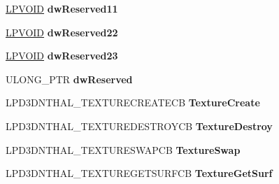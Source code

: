 \begin{DoxyCompactItemize}
\item 
\mbox{\label{struct___d3_d_n_t_h_a_l___c_a_l_l_b_a_c_k_s_a8bdbd855926ec876c686cafb674fb800}} 
\hyperlink{interfacevoid}{L\+P\+V\+O\+ID} {\bfseries dw\+Reserved11}
\item 
\mbox{\label{struct___d3_d_n_t_h_a_l___c_a_l_l_b_a_c_k_s_aa2dd9caa928e2311efc2f8edea6fb0ca}} 
\hyperlink{interfacevoid}{L\+P\+V\+O\+ID} {\bfseries dw\+Reserved22}
\item 
\mbox{\label{struct___d3_d_n_t_h_a_l___c_a_l_l_b_a_c_k_s_a8f785ee26b36d60c62904efad6a8d55d}} 
\hyperlink{interfacevoid}{L\+P\+V\+O\+ID} {\bfseries dw\+Reserved23}
\item 
\mbox{\label{struct___d3_d_n_t_h_a_l___c_a_l_l_b_a_c_k_s_a439bb2d9bf1078f262b0f1f8d0606d8a}} 
U\+L\+O\+N\+G\+\_\+\+P\+TR {\bfseries dw\+Reserved}
\item 
\mbox{\label{struct___d3_d_n_t_h_a_l___c_a_l_l_b_a_c_k_s_a6a93471a54b457d7cb911c0ed8cefc10}} 
L\+P\+D3\+D\+N\+T\+H\+A\+L\+\_\+\+T\+E\+X\+T\+U\+R\+E\+C\+R\+E\+A\+T\+E\+CB {\bfseries Texture\+Create}
\item 
\mbox{\label{struct___d3_d_n_t_h_a_l___c_a_l_l_b_a_c_k_s_af343fef8a1746b283abfb38a13bfa8a8}} 
L\+P\+D3\+D\+N\+T\+H\+A\+L\+\_\+\+T\+E\+X\+T\+U\+R\+E\+D\+E\+S\+T\+R\+O\+Y\+CB {\bfseries Texture\+Destroy}
\item 
\mbox{\label{struct___d3_d_n_t_h_a_l___c_a_l_l_b_a_c_k_s_a278caf9e0ba7a0bfa00a7e1d1bf9f08d}} 
L\+P\+D3\+D\+N\+T\+H\+A\+L\+\_\+\+T\+E\+X\+T\+U\+R\+E\+S\+W\+A\+P\+CB {\bfseries Texture\+Swap}
\item 
\mbox{\label{struct___d3_d_n_t_h_a_l___c_a_l_l_b_a_c_k_s_a6b46cb5df565dce149f2e33c4b4beea8}} 
L\+P\+D3\+D\+N\+T\+H\+A\+L\+\_\+\+T\+E\+X\+T\+U\+R\+E\+G\+E\+T\+S\+U\+R\+F\+CB {\bfseries Texture\+Get\+Surf}
\item 
\mbox{\label{struct___d3_d_n_t_h_a_l___c_a_l_l_b_a_c_k_s_a2e8e57cc8b058d19cba82efd4a15f234}} 

\end{DoxyCompactItemize}
